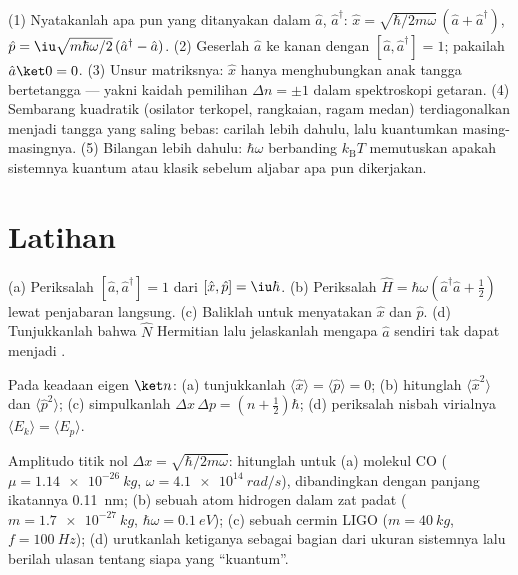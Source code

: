 \begin{method}\label{met:b3:harmonic-oscillator:method}
(1) Nyatakanlah apa pun yang ditanyakan dalam $\hat a$, $\hat a^\dagger$: $\hat x
= \sqrt{\hbar/2m\omega}\,(\hat a + \hat a^\dagger)$, $\hat p =
\iu\sqrt{m\hbar\omega/2}\,(\hat a^\dagger - \hat a)$. (2) Geserlah
$\hat a$ ke kanan dengan $[\hat a, \hat a^\dagger] = 1$; pakailah
$\hat a\ket0 = 0$. (3) Unsur matriksnya: $\hat x$ hanya menghubungkan
anak tangga bertetangga --- yakni kaidah pemilihan $\Delta n = \pm1$
dalam spektroskopi getaran. (4) Sembarang  kuadratik
(osilator terkopel, rangkaian, ragam medan) terdiagonalkan menjadi
tangga yang saling bebas: carilah  lebih dahulu, lalu
kuantumkan masing-masingnya. (5) Bilangan lebih dahulu:
$\hbar\omega$ berbanding $k_{\text{B}}T$ memutuskan apakah sistemnya
kuantum atau klasik sebelum aljabar apa pun dikerjakan.
\end{method}

\section{Latihan}

\begin{exercise}[$\star$]\label{exo:b3:harmonic-oscillator:1}
(a) Periksalah $[\hat a, \hat a^\dagger] = 1$ dari $[\hat x, \hat p] =
\iu\hbar$. (b) Periksalah $\hat H = \hbar\omega(\hat a^\dagger\hat a +
\tfrac12)$ lewat penjabaran langsung. (c) Baliklah untuk menyatakan
$\hat x$ dan $\hat p$. (d) Tunjukkanlah bahwa $\hat N$ Hermitian lalu
jelaskanlah mengapa $\hat a$ sendiri tak dapat menjadi .
\end{exercise}

\begin{exercise}[$\star$]\label{exo:b3:harmonic-oscillator:2}
Pada keadaan eigen $\ket n$: (a) tunjukkanlah $\langle\hat x\rangle =
\langle\hat p\rangle = 0$; (b) hitunglah $\langle\hat x^2\rangle$ dan
$\langle\hat p^2\rangle$; (c) simpulkanlah $\Delta x\,\Delta p = (n +
\tfrac12)\hbar$; (d) periksalah nisbah virialnya $\langle E_k\rangle =
\langle E_p\rangle$.
\end{exercise}

\begin{exercise}[$\star$]\label{exo:b3:harmonic-oscillator:3}
Amplitudo titik nol $\Delta x = \sqrt{\hbar/2m\omega}$: hitunglah
untuk (a) molekul CO ($\mu = \qty{1.14e-26}{kg}$, $\omega =
\qty{4.1e14}{rad/s}$), dibandingkan dengan panjang ikatannya
\qty{0.11}{nm}; (b) sebuah atom hidrogen dalam zat padat ($m =
\qty{1.7e-27}{kg}$, $\hbar\omega = \qty{0.1}{eV}$); (c) sebuah cermin
LIGO ($m = \qty{40}{kg}$, $f = \qty{100}{Hz}$); (d) urutkanlah
ketiganya sebagai bagian dari ukuran sistemnya lalu berilah ulasan
tentang siapa yang ``kuantum''.
\end{exercise}

